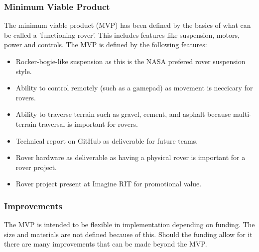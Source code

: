 \documentclass[conference]{IEEEtran} %
\begin{document}
\subsubsection{Minimum Viable Product}
\label{mvp}
  The minimum viable product (MVP) has been defined by the basics of what can be called a 'functioning rover'. This includes features like suspension, motors, power and controls. The MVP is defined by the following features: 

\begin{itemize}
  \item Rocker-bogie-like suspension as this is the NASA prefered rover suspension style. 
  \item Ability to control remotely (such as a gamepad) as movement is neccicary for rovers.
  \item Ability to traverse terrain such as gravel, cement, and asphalt because multi-terrain traversal is important for rovers. 
  \item Technical report on GitHub as deliverable for future teams.
  \item Rover hardware as deliverable as having a physical rover is important for a rover project. 
  \item Rover project present at Imagine RIT for promotional value.
\end{itemize}

\subsubsection{Improvements}
\label{improvements}

  The MVP is intended to be flexible in implementation depending on funding. The size and materials are not defined because of this. Should the funding allow for it there are many improvements that can be made beyond the MVP. 
\end{document}
